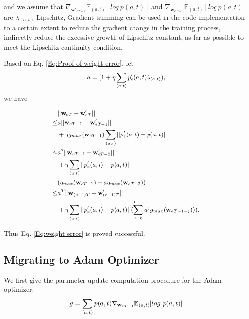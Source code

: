 and we assume that $\nabla_{\mathbf w'_{eT-1}}\mathbb{E}_{(a,t)}[log\ p(a,t)]$ and $\nabla_{\mathbf w_{eT-1}}\mathbb{E}_{(a,t)}[log\ p(a,t)]$ are $\lambda_{(a,t)}$-Lipschitz, Gradient trimming can be used in the code implementation to a certain extent to reduce the gradient change in the training process, indirectly reduce the excessive growth of Lipschitz constant, as far as possible to meet the Lipschitz continuity condition.

Based on Eq. \eqref{Eq:Proof of weight error}, let 
\begin{equation}
\small
    \begin{aligned}
    a=(1+\eta\sum_{(a,t)}p'_e(a,t)\lambda_{(a,t)}),
    \end{aligned}
\end{equation}
we have

\begin{equation}
\small
    \begin{aligned}
        &||\mathbf w_{eT}-\mathbf w'_{eT}||\\
        \leq&a||\mathbf w_{eT-1}-\mathbf w'_{eT-1}||\\
        &+\eta g_{max}(\mathbf w_{eT-1})\sum_{(a,t)}||p'_e(a,t)-p(a,t)||\\
        \leq&a^2||\mathbf w_{eT-2}-\mathbf w'_{eT-2}||\\
        &+\eta \sum_{(a,t)}||p'_e(a,t)-p(a,t)||\\
        &(g_{max}(\mathbf w_{eT-1})+ag_{max}(\mathbf w_{eT-2}))\\
        \leq&a^{T}||\mathbf w_{(e-1)T}-\mathbf w'_{(e-1)T}||\\
        &+\eta \sum_{(a,t)}||p'_e(a,t)-p(a,t)||(\sum^{T-1}_{j=0} a^jg_{max}(\mathbf w_{eT-1-j}))).
    \end{aligned}
\end{equation}

Thus Eq. \eqref{Eq:weight error} is proved successful.

\subsection{Migrating to Adam Optimizer}
\label{Appe:Migrating}
We first give the parameter update computation procedure for the Adam optimizer:
\begin{equation}
    g=\sum_{(a,t)}p(a,t)\nabla_{\mathbf w_{eT-1}}\mathbb{E}_{(a,t)}[log\ p(a,t)]\\
\end{equation}


